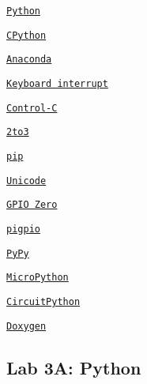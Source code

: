 
\begin{DoxyItemize}
\item \href{https://en.wikipedia.org/wiki/Python_(programming_language)}{\tt Python}
\begin{DoxyItemize}
\item \href{https://en.wikipedia.org/wiki/CPython}{\tt C\+Python}
\item \href{https://en.wikipedia.org/wiki/Anaconda_(Python_distribution)}{\tt Anaconda}
\item \href{https://en.wikipedia.org/wiki/Keyboard_interrupt}{\tt Keyboard interrupt}
\item \href{https://en.wikipedia.org/wiki/Control-C}{\tt Control-\/C}
\end{DoxyItemize}
\item \href{https://docs.python.org/3/library/2to3.html}{\tt 2to3}
\item \href{https://en.wikipedia.org/wiki/Pip_(package_manager)}{\tt pip}
\item \href{https://en.wikipedia.org/wiki/Unicode}{\tt Unicode}
\item \href{https://gpiozero.readthedocs.io/en/stable}{\tt G\+P\+IO Zero}
\item \href{http://abyz.me.uk/rpi/pigpio}{\tt pigpio}
\item \href{https://en.wikipedia.org/wiki/PyPy}{\tt Py\+Py}
\item \href{https://en.wikipedia.org/wiki/MicroPython}{\tt Micro\+Python}
\item \href{https://en.wikipedia.org/wiki/CircuitPython}{\tt Circuit\+Python}
\item \href{https://en.wikipedia.org/wiki/Doxygen}{\tt Doxygen}
\end{DoxyItemize}

\subsection*{Lab 3A\+: Python}


